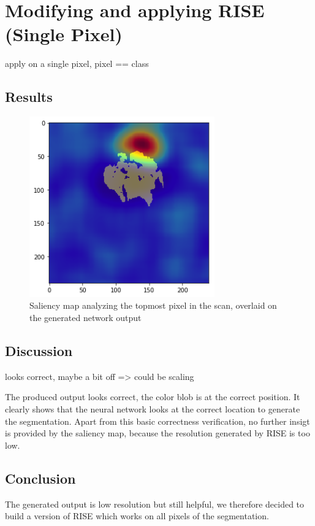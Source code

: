 \section{Modifying and applying RISE (Single Pixel)}

apply on a single pixel, pixel == class

\subsection{Results}

\begin{figure}[H]
\centering
\includegraphics[width=8cm]{chapters/04_segmentation/images/rise_single_pixel.png}
\caption{Saliency map analyzing the topmost pixel in the scan, overlaid on the generated network output}
\end{figure}



\subsection{Discussion}
looks correct, maybe a bit off => could be scaling

The produced output looks correct, the color blob is at the correct position. It clearly shows that the neural network looks at the correct location to generate the segmentation.
Apart from this basic correctness verification, no further insigt is provided by the saliency map, because the resolution generated by RISE is too low.

\subsection{Conclusion}
The generated output is low resolution but still helpful, we therefore decided to build a version of RISE which works on all pixels of the segmentation.

